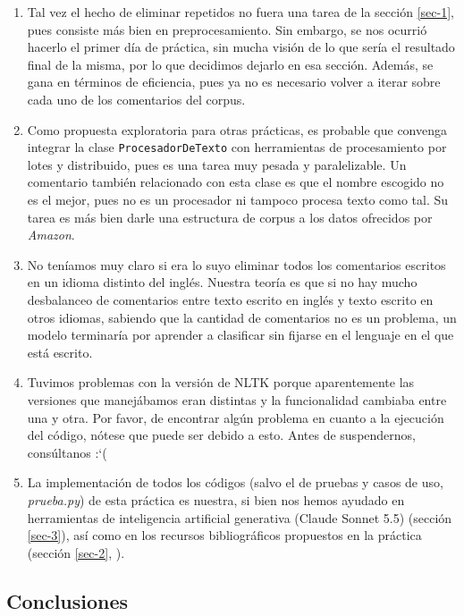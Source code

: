 \documentclass[10pt,a4paper]{article}
\begin{document}
\begin{enumerate}
    \item Tal vez el hecho de eliminar repetidos no fuera una tarea de la sección \ref{sec-1}, pues consiste más bien en 
    preprocesamiento. Sin embargo, se nos ocurrió hacerlo el primer día de práctica, sin mucha visión de lo que sería el 
    resultado final de la misma, por lo que decidimos dejarlo en esa sección. Además, se gana en términos de eficiencia, pues 
    ya no es necesario volver a iterar sobre cada uno de los comentarios del corpus. 
    \item Como propuesta exploratoria para otras prácticas, es probable que convenga integrar la clase \texttt{ProcesadorDeTexto}
    con herramientas de procesamiento por lotes y distribuido, pues es una tarea muy pesada y paralelizable. Un comentario 
    también relacionado con esta clase es que el nombre escogido no es el mejor, pues no es un procesador ni tampoco procesa texto
    como tal. Su tarea es más bien darle una estructura de corpus a los datos ofrecidos por \textit{Amazon}. 
    \item No teníamos muy claro si era lo suyo eliminar todos los comentarios escritos en un idioma distinto del inglés. 
    Nuestra teoría es que si no hay mucho desbalanceo de comentarios entre texto escrito en inglés y texto escrito en otros 
    idiomas, sabiendo que la cantidad de comentarios no es un problema, un modelo terminaría por aprender a clasificar sin
    fijarse en el lenguaje en el que está escrito. 
    \item Tuvimos problemas con la versión de NLTK porque aparentemente las versiones que manejábamos eran distintas y 
    la funcionalidad cambiaba entre una y otra. Por favor, de encontrar algún problema en cuanto a la ejecución del 
    código, nótese que puede ser debido a esto. Antes de suspendernos, consúltanos :`(
    \item La implementación de todos los códigos (salvo el de pruebas y casos de uso, \textit{prueba.py}) de esta práctica 
    es nuestra, si bien nos hemos ayudado en herramientas de inteligencia artificial generativa (Claude Sonnet 5.5)
    (sección \ref{sec-3}), así como en los recursos bibliográficos propuestos en la práctica (sección \ref{sec-2}, \cite{bengfort2018}). 
\end{enumerate}

\subsection{Conclusiones}
\end{document}

